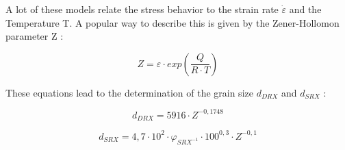 A lot of these models relate the stress behavior to the strain rate $\dot{\varepsilon}$ and the Temperature T. A popular way to describe this is given by the Zener-Hollomon parameter Z \cite{ZEN44}:

\begin{equation}
 Z =  \varepsilon\cdot exp\left( \frac{Q}{R\cdot T}\right)
\end{equation}

These equations lead to the determination of the grain size $d_{DRX}$ and $d_{SRX}$ \cite{DEH08}:

\begin{equation}
 d_{DRX} =  5916\cdot Z^{-0,1748}
\end{equation}

\begin{equation}
 d_{SRX} =  4,7\cdot10^{2}\cdot\varphi_{SRX^{-1}}\cdot100^{0,3}\cdot Z^{-0,1}
\end{equation}
